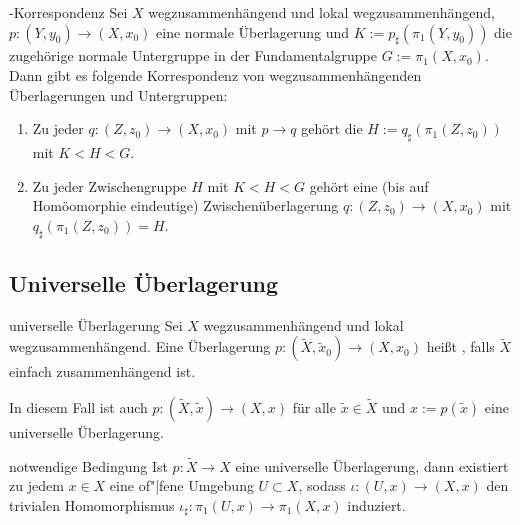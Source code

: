 \begin{Satz}{-Korrespondenz}
    Sei $X$ wegzusammenhängend und lokal wegzusammenhängend,
    $p\colon (Y, y_0) \rightarrow (X, x_0)$ eine normale Überlagerung und
    $K := p_\sharp(\pi_1(Y, y_0))$ die zugehörige normale Untergruppe in der
    Fundamentalgruppe $G := \pi_1(X, x_0)$.
    Dann gibt es folgende Korrespondenz von wegzusammenhängenden Überlagerungen
    und Untergruppen:
    \begin{enumerate}
        \item
        Zu jeder 
        $q\colon (Z, z_0) \rightarrow (X, x_0)$ mit
        $p \rightarrow q$ gehört die 
        $H := q_\sharp(\pi_1(Z, z_0))$ mit $K < H < G$.

        \item
        Zu jeder Zwischengruppe $H$ mit $K < H < G$ gehört eine
        (bis auf Homöomorphie eindeutige) Zwischenüberlagerung
        $q\colon (Z, z_0) \rightarrow (X, x_0)$ mit
        $q_\sharp(\pi_1(Z, z_0)) = H$.
    \end{enumerate}
\end{Satz}

\pagebreak

\subsection{%
    Universelle Überlagerung%
}

\begin{Def}{universelle Überlagerung}
    Sei $X$ wegzusammenhängend und lokal wegzusammenhängend.
    Eine Überlagerung
    $p\colon (\widetilde{X}, \widetilde{x}_0) \rightarrow (X, x_0)$ heißt
    , falls $\widetilde{X}$ einfach zusammenhängend ist.
\end{Def}

\begin{Bem}
    In diesem Fall ist auch
    $p\colon (\widetilde{X}, \widetilde{x}) \rightarrow (X, x)$ für alle
    $\widetilde{x} \in \widetilde{X}$ und $x := p(\widetilde{x})$ eine
    universelle Überlagerung.
\end{Bem}

\linie

\begin{Satz}{notwendige Bedingung}
    Ist $p\colon \widetilde{X} \rightarrow X$ eine universelle Überlagerung,
    dann existiert zu jedem $x \in X$ eine of"|fene Umgebung $U \subset X$,
    sodass $\iota\colon (U, x) \rightarrow (X, x)$ den trivialen Homomorphismus
    $\iota_\sharp\colon \pi_1(U, x) \rightarrow \pi_1(X, x)$ induziert.
\end{Satz}

